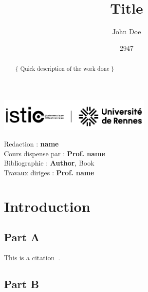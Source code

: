 \documentclass{config/ISTICUR}
\title{\fontfamily{phv}\selectfont \textbf{Title}}
\date{2947}
\author{John Doe}
\begin{document}
    \begin{titlepage}
        \maketitle
        \center\includegraphics[width=3in]{assets/logos/ISTIC/PNG/noir}

        \begin{abstract}
            \{
            Quick description of the work done
            \}
        \end{abstract}
        \vspace{5em}

        \newpage

        \tableofcontents

        \vspace{5em}

        \begin{contributors}
            \vspace{.25em}
            Redaction : \textbf{name} \\
            Cours dispense par : \textbf{Prof. name} \\
            Bibliographie : \textbf{Author}, Book\\
            Travaux diriges : \textbf{Prof. name} \\
            \vspace{.25em}
        \end{contributors}

    \end{titlepage}

    \section{Introduction}\label{sec:intro}
    \subsection{Part A}\label{subsec:a}
    This is a citation~\cite{ahu61}.
    \subsection{Part B}\label{subsec:b}

    
    
\end{document}
